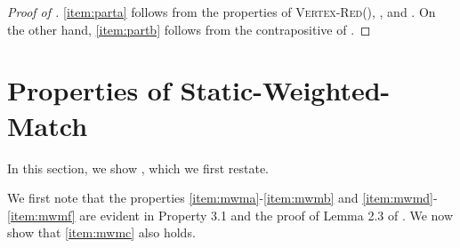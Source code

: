 \documentclass[a4paper,11pt]{article}
\theoremstyle{definition}
\theoremstyle{definition}
\theoremstyle{definition}
\theoremstyle{definition}
\theoremstyle{definition}
\theoremstyle{definition}
\theoremstyle{definition}
\theoremstyle{definition}
\theoremstyle{definition}
\theoremstyle{definition}
\theoremstyle{definition}
\theoremstyle{definition}
\theoremstyle{definition}
\theoremstyle{definition}
\theoremstyle{definition}
\begin{document}
\begin{proof}[Proof of ]
 \ref{item:parta} follows from the properties of \textsc{Vertex-Red}(),  , and . On the other hand, \ref{item:partb} follows from the contrapositive of . 
\end{proof}

\section{Properties of Static-Weighted-Match}

In this section, we show , which we first restate.

\swm*

We first note that the properties \ref{item:mwma}-\ref{item:mwmb} and \ref{item:mwmd}-\ref{item:mwmf} are evident in Property 3.1 and the proof of Lemma 2.3 of \cite{DP14}. We now show that \ref{item:mwmc} also holds.
\end{document}
